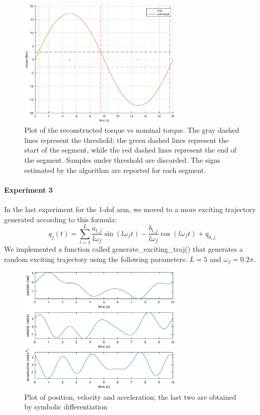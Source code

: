 \documentclass{article}
\begin{document}
\begin{figure}[!htbp]
\centering
\includegraphics[width=0.7\textwidth]{images/1-dof/results2.eps}
\caption{Plot of the reconstructed torque vs nominal torque. The gray dashed lines represent the threshold; the green dashed lines represent the start of the segment, while the red dashed lines represent the end of the segment. Samples under threshold are discarded. The signs estimated by the algorithm are reported for each segment.}
\end{figure}
\FloatBarrier

\paragraph{Experiment 3} In the last experiment for the 1-dof arm, we moved to a more exciting trajectory generated according to this formula:
\[q_j(t) = \sum_{l=1}^{L}{\frac{ a_{l,j}}{ l\omega_f }\sin(l\omega_f t)-\frac{ b_{l,j}}{l\omega_f}\cos(l\omega_f t)+q_{0,j}}\]
We implemented a function called generate\_exciting\_traj() that generates a random exciting trajectory using the following parameters: $L = 5$ and $\omega_f = 0.2\pi$.

\begin{figure}[!htbp]
\centering
\includegraphics[width=0.7\textwidth]{images/1-dof/trajectory1.eps}
\caption{Plot of position, velocity and acceleration; the last two are obtained by symbolic differentiation}
\end{figure}
\FloatBarrier
\end{document}
